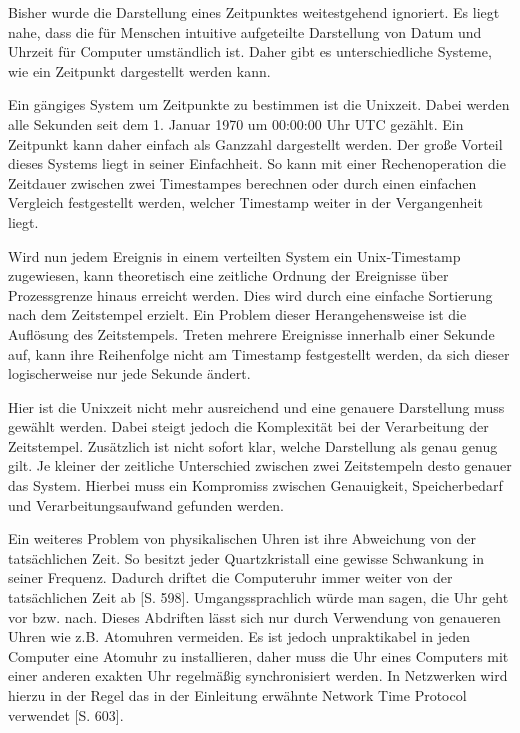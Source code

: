 Bisher wurde die Darstellung eines Zeitpunktes weitestgehend ignoriert. Es liegt nahe, dass die für Menschen intuitive aufgeteilte Darstellung von Datum und Uhrzeit für Computer umständlich ist. Daher gibt es unterschiedliche Systeme, wie ein Zeitpunkt dargestellt werden kann.

Ein gängiges System um Zeitpunkte zu bestimmen ist die Unixzeit.
Dabei werden alle Sekunden seit dem 1. Januar 1970 um 00:00:00 Uhr UTC gezählt.
Ein Zeitpunkt kann daher einfach als Ganzzahl dargestellt werden.
Der große Vorteil dieses Systems liegt in seiner Einfachheit.
So kann mit einer Rechenoperation die Zeitdauer zwischen zwei Timestampes berechnen oder durch einen einfachen Vergleich festgestellt werden, welcher Timestamp weiter in der Vergangenheit liegt.

Wird nun jedem Ereignis in einem verteilten System ein Unix-Timestamp zugewiesen, kann theoretisch eine zeitliche Ordnung der Ereignisse über Prozessgrenze hinaus erreicht werden. Dies wird durch eine einfache Sortierung nach dem Zeitstempel erzielt.
Ein Problem dieser Herangehensweise ist die Auflösung des Zeitstempels. Treten mehrere Ereignisse innerhalb einer Sekunde auf, kann ihre Reihenfolge nicht am Timestamp festgestellt werden, da sich dieser logischerweise nur jede Sekunde ändert.

Hier ist die Unixzeit nicht mehr ausreichend und eine genauere Darstellung muss gewählt werden.
Dabei steigt jedoch die Komplexität bei der Verarbeitung der Zeitstempel.
Zusätzlich ist nicht sofort klar, welche Darstellung als genau genug gilt.
Je kleiner der zeitliche Unterschied zwischen zwei Zeitstempeln desto genauer das System.
Hierbei muss ein Kompromiss zwischen Genauigkeit, Speicherbedarf und Verarbeitungsaufwand gefunden werden.

Ein weiteres Problem von physikalischen Uhren ist ihre Abweichung von der tatsächlichen Zeit.
So besitzt jeder Quartzkristall eine gewisse Schwankung in seiner Frequenz.
Dadurch driftet die Computeruhr immer weiter von der tatsächlichen Zeit ab \cite{Coulouris2011}[S. 598].
Umgangssprachlich würde man sagen, die Uhr geht vor bzw. nach.
Dieses Abdriften lässt sich nur durch Verwendung von genaueren Uhren wie z.B. Atomuhren vermeiden.
Es ist jedoch unpraktikabel in jeden Computer eine Atomuhr zu installieren, daher muss die Uhr eines Computers mit einer anderen exakten Uhr regelmäßig synchronisiert werden.
In Netzwerken wird hierzu in der Regel das in der Einleitung erwähnte Network Time Protocol verwendet \cite{Coulouris2011}[S. 603].

